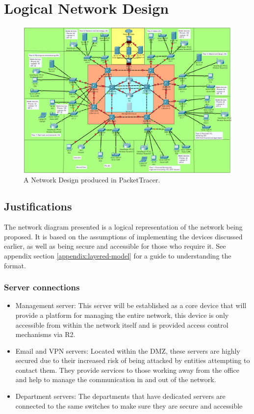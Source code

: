 \chapter{Logical Network Design}

\begin{figure}[ht]
    \includegraphics[width=15cm]{Figures/Network_Diagram.png}
    \caption{A Network Design produced in PacketTracer.}
    \label{fig:Network_Diagram}
\end{figure}

\section{Justifications}

The network diagram presented is a logical representation of the network being proposed. It is based on the assumptions of implementing the devices discussed earlier, as well as being secure and accessible for those who require it. See appendix section \ref{appendix:layered-model} for a guide to understanding the format.

\subsection{Server connections}
\begin{itemize}
    \item Management server: This server will be established as a core device that will provide a platform for managing the entire network, this device is only accessible from within the network itself and is provided access control mechanisms via R2.
    \item Email and VPN servers: Located within the DMZ, these servers are highly secured due to their increased risk of being attacked by entities attempting to contact them. They provide services to those working away from the office and help to manage the communication in and out of the network.
    \item Department servers: The departments that have dedicated servers are connected to the same switches to make sure they are secure and accessible
\end{itemize}

